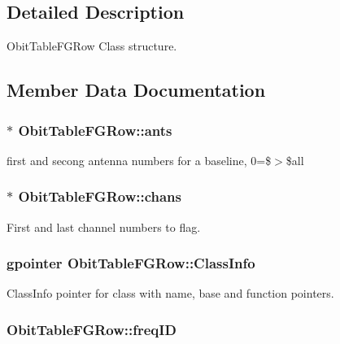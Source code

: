 \subsection{Detailed Description}
Obit\-Table\-FGRow Class structure. 



\subsection{Member Data Documentation}
\subsubsection{$\ast$ {\bf Obit\-Table\-FGRow::ants}}\label{structObitTableFGRow_o9}


first and secong antenna numbers for a baseline, 0=\$$>$\$all 

\subsubsection{$\ast$ {\bf Obit\-Table\-FGRow::chans}}\label{structObitTableFGRow_o12}


First and last channel numbers to flag. 

\subsubsection{\setlength{\rightskip}{0pt plus 5cm}gpointer {\bf Obit\-Table\-FGRow::Class\-Info}}\label{structObitTableFGRow_o1}


Class\-Info pointer for class with name, base and function pointers. 

\subsubsection{ {\bf Obit\-Table\-FGRow::freq\-ID}}\label{structObitTableFGRow_o8}


